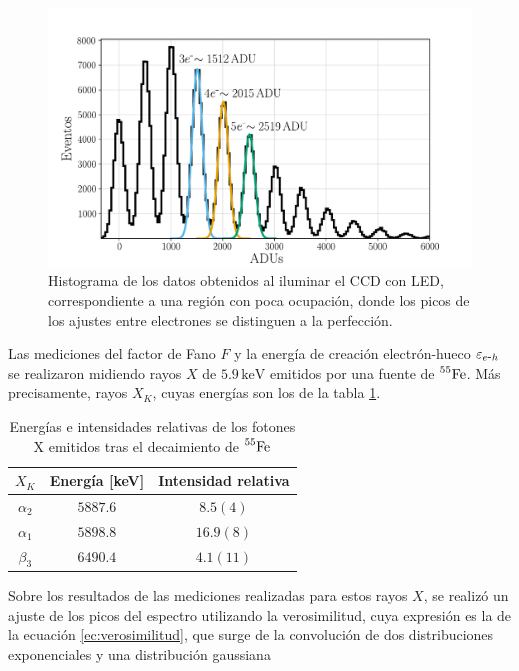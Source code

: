 \begin{figure}[H]
    \centering
        \includegraphics[scale=0.5]{Figs/ajuste_gaussiano_calibracion.pdf}
    \caption{\footnotesize{Histograma de los datos obtenidos al iluminar el CCD con LED, correspondiente a una región con poca ocupación, donde los picos de los ajustes entre electrones se distinguen a la perfección.}}
    \label{fig:Calibracion}
\end{figure}
Las mediciones del factor de Fano $F$ y la energía de creación electrón-hueco $\varepsilon_{e\mbox{-}h}$ se realizaron midiendo rayos $X$ de $5.9\,\si{\mbox{keV}}$ emitidos por una fuente de $\prescript{55}{}{\mbox{Fe}}$. Más precisamente, rayos $X_{K}$, cuyas energías son los de la tabla \ref{tab:EnergiasXk}.
\begin{table}[h]
\centering
\begin{tabular}{@{}ccc@{}}
\toprule
$X_{K}$         &   Energía [keV]   &   Intensidad relativa \\ \hline \hline
$\alpha_{2}$    &   $5887.6$        &   $8.5 (4)$           \\
$\alpha_{1}$    &   $5898.8$        &   $16.9 (8)$          \\
$\beta_{3}$     &   $6490.4$        &   $4.1 (11)$          \\ \bottomrule
\end{tabular}
\caption{\footnotesize{Energías e intensidades relativas de los fotones X emitidos tras el decaimiento de $\prescript{55}{}{\mbox{Fe}}$}}
\label{tab:EnergiasXk}
\end{table}
Sobre los resultados de las mediciones realizadas para estos rayos $X$, se realizó un ajuste de los picos del espectro utilizando la verosimilitud, cuya expresión es la de la ecuación \eqref{ec:verosimilitud}, que surge de la convolución de dos distribuciones exponenciales y una distribución gaussiana

